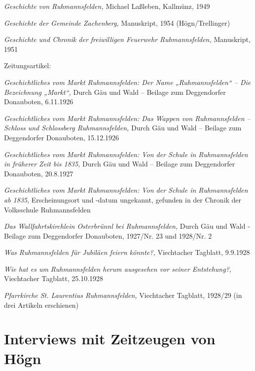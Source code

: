 \documentclass{book}
\begin{document}
\textit{Geschichte von Ruhmannsfelden,} Michael Laßleben, Kallmünz, 1949


\textit{Geschichte der Gemeinde Zachenberg,} Manuskript, 1954
(Högn/Trellinger)

\textit{Geschichte und Chronik der freiwilligen Feuerwehr
Ruhmannsfelden,} Manuskript, 1951 

Zeitungsartikel:

\textit{Geschichtliches vom Markt Ruhmannsfelden: Der Name
„Ruhmannsfelden“ – Die Bezeichnung „Markt“,} Durch Gäu und Wald –
Beilage zum Deggendorfer Donauboten, 6.11.1926

\textit{Geschichtliches vom Markt Ruhmannsfelden: Das Wappen von
Ruhmannsfelden – Schloss und Schlossberg Ruhmannsfelden,} Durch Gäu und
Wald – Beilage zum Deggendorfer Donauboten, 15.12.1926

\textit{Geschichtliches vom Markt Ruhmannsfelden: Von der Schule in
Ruhmannsfelden in früherer Zeit bis 1835,} Durch Gäu und Wald – Beilage
zum Deggendorfer Donauboten, 20.8.1927

\textit{Geschichtliches vom Markt Ruhmannsfelden: Von der Schule in
Ruhmannsfelden ab 1835}, Erscheinungsort und -datum ungekannt, gefunden
in der Chronik der Volksschule Ruhmannsfelden

\textit{Das Wallfahrtskirchlein Osterbrünnl bei Ruhmannsfelden,} Durch
Gäu und Wald - Beilage zum Deggendorfer Donauboten, 1927/Nr. 23 und 
1928/Nr. 2

\textit{Was Ruhmannsfelden für Jubiläen feiern könnte?,} Viechtacher
Tagblatt, 9.9.1928

\textit{Wie hat es um Ruhmannsfelden herum ausgesehen vor seiner
Entstehung?,} Viechtacher Tagblatt, 25.10.1928

\textit{Pfarrkirche St. Laurentius Ruhmannsfelden,} Viechtacher
Tagblatt, 1928/29 (in drei Artikeln erschienen)

\section{Interviews mit Zeitzeugen von Högn}
\end{document}
